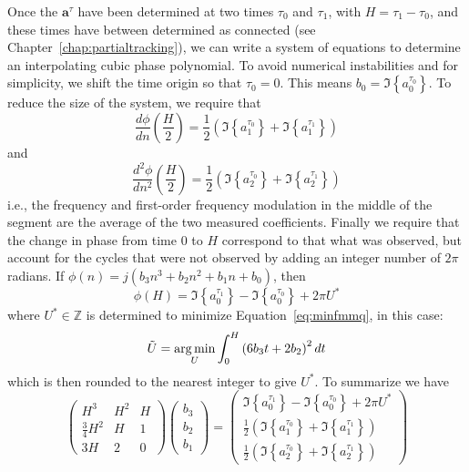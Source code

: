 Once the $\boldsymbol{a}^{\tau}$ have been determined
at two times $\tau_{0}$ and $\tau_{1}$, with $H = \tau_{1} - \tau_{0}$, and these
times have between determined as connected (see
Chapter~\ref{chap:partialtracking}), we can write a system of equations
to determine an interpolating cubic phase polynomial. To avoid numerical
instabilities and for simplicity, we shift the time origin so that
${\tau_{0} = 0}$.
This means ${b_0 = \Im \left\{ a^{\tau_0}_{0} \right\}}$. To reduce the size
of the system, we require that 
\[
    \frac{d \phi}{d n} \left(\frac{H}{2} \right)
    =
    \frac{1}{2}
    \left( \Im \left\{ a^{\tau_0}_{1} \right\} + \Im \left\{ a^{\tau_1}_{1}
    \right\} \right)
\]
and
\[
    \frac{d^{2} \phi}{d n^{2}} \left(\frac{H}{2}
    \right)
    =
    \frac{1}{2} \left( \Im \left\{ a^{\tau_0}_{2} \right\} + \Im \left\{
    a^{\tau_1}_{2} \right\} \right)
\]
i.e., the frequency and first-order frequency modulation in the middle of the
segment are the average of the two measured coefficients. Finally we require
that the change in phase from time $0$ to $H$ correspond to that what was
observed, but account for the cycles that were not observed by adding an integer
number of $2\pi$ radians. If $\phi(n)=j(b_3 n^{3} + b_2 n^{2} + b_1 n + b_0)$,
then
\[
    \phi \left( H \right)
    =
    \Im \left\{ a^{\tau_1}_{0} \right\} - \Im \left\{ a^{\tau_0}_{0} \right\}
    + 2 \pi U^{\ast}
\]
where $U^{\ast} \in \mathbb{Z}$ is determined to minimize
Equation~\ref{eq:minfmmq}, in this case:
\begin{equation}
    \label{eq:minfmcubic}
    \tilde{U} = \mathop{\rm arg\,min}_{U} \int_{0}^{H} \left(
    6 b_3 t + 2 b_2 \right)^{2} dt
\end{equation}
which is then rounded to the nearest integer to give $U^{\ast}$. To summarize we have
\[
    \begin{pmatrix}
        H^{3} & H^{2} & H \\
        \frac{3}{4}H^{2} & H & 1 \\
        3 H & 2 & 0
    \end{pmatrix}
    \begin{pmatrix}
        b_{3} \\
        b_{2} \\
        b_{1}
    \end{pmatrix}
    =
    \begin{pmatrix}
        \Im \left\{ a^{\tau_1}_{0} \right\} - \Im \left\{ a^{\tau_0}_{0} \right\}
            + 2 \pi U^{\ast} \\
        \frac{1}{2}
        \left( \Im \left\{ a^{\tau_0}_{1} \right\} + \Im \left\{ a^{\tau_1}_{1}
        \right\} \right) \\
        \frac{1}{2} \left( \Im \left\{ a^{\tau_0}_{2} \right\} + \Im \left\{
        a^{\tau_1}_{2} \right\} \right)
    \end{pmatrix}
\]
